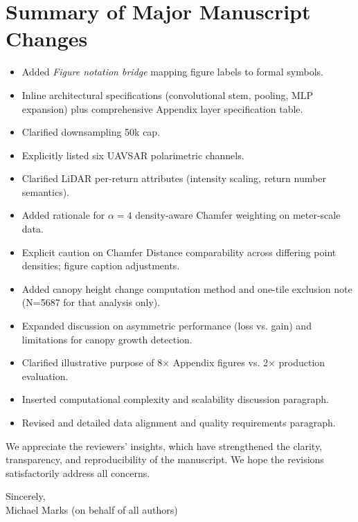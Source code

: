 \documentclass[11pt]{article}
\begin{document}
\section*{Summary of Major Manuscript Changes}
\begin{itemize}
  \item Added \emph{Figure notation bridge} mapping figure labels to formal symbols.
  \item Inline architectural specifications (convolutional stem, pooling, MLP expansion) plus comprehensive Appendix layer specification table.
  \item Clarified downsampling 50k cap.
  \item Explicitly listed six UAVSAR polarimetric channels.
  \item Clarified LiDAR per-return attributes (intensity scaling, return number semantics).
  \item Added rationale for $\alpha=4$ density-aware Chamfer weighting on meter-scale data.
  \item Explicit caution on Chamfer Distance comparability across differing point densities; figure caption adjustments.
  \item Added canopy height change computation method and one-tile exclusion note (N=5687 for that analysis only).
  \item Expanded discussion on asymmetric performance (loss vs. gain) and limitations for canopy growth detection.
  \item Clarified illustrative purpose of 8× Appendix figures vs. 2× production evaluation.
  \item Inserted computational complexity and scalability discussion paragraph.
  \item Revised and detailed data alignment and quality requirements paragraph.
\end{itemize}

We appreciate the reviewers’ insights, which have strengthened the clarity, transparency, and reproducibility of the manuscript. We hope the revisions satisfactorily address all concerns.

\vspace{1em}
\noindent Sincerely,\\[4pt]
Michael Marks (on behalf of all authors)
\end{document}
